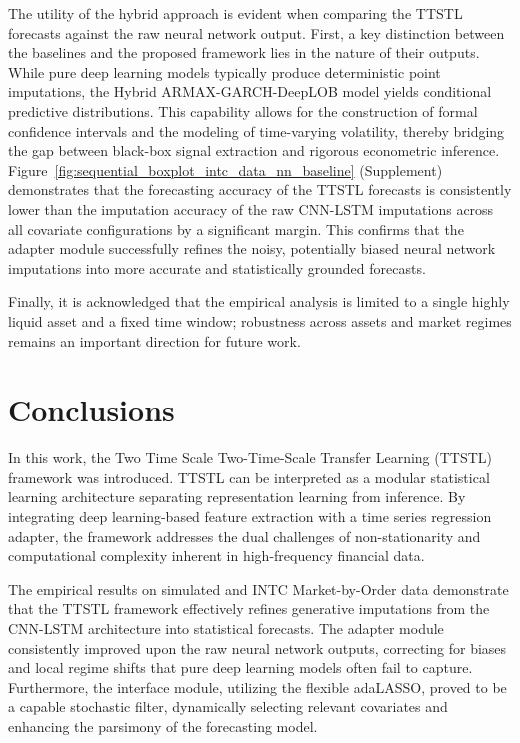 \documentclass[10pt,a4paper,oneside]{article}
\providecommand{\DIFaddtex}[1]{{\protect\color{blue} \sf #1}} %
\providecommand{\DIFdeltex}[1]{{\protect\color{red} \scriptsize #1}} %
\providecommand{\DIFaddbegin}{} %
\providecommand{\DIFaddend}{} %
\providecommand{\DIFdelbegin}{} %
\providecommand{\DIFdelend}{} %
\providecommand{\DIFadd}[1]{\texorpdfstring{\DIFaddtex{#1}}{#1}} %
\providecommand{\DIFdel}[1]{\texorpdfstring{\DIFdeltex{#1}}{}} %
\newcommand{\DIFscaledelfig}{0.5}
\newlength{\DIFdelgraphicswidth} %
\newlength{\DIFdelgraphicsheight} %
\newcommand{\DIFaddincludegraphics}[2][]{{\color{blue}\fbox{\DIFOincludegraphics[#1]{#2}}}} %
\newcommand{\DIFdelincludegraphics}[2][]{%
\sbox{\DIFdelgraphicsbox}{\DIFOincludegraphics[#1]{#2}}%
\settoboxwidth{\DIFdelgraphicswidth}{\DIFdelgraphicsbox} %
\settoboxtotalheight{\DIFdelgraphicsheight}{\DIFdelgraphicsbox} %
\scalebox{\DIFscaledelfig}{%
\parbox[b]{\DIFdelgraphicswidth}{\usebox{\DIFdelgraphicsbox}\\[-\baselineskip] \rule{\DIFdelgraphicswidth}{0em}}\llap{\resizebox{\DIFdelgraphicswidth}{\DIFdelgraphicsheight}{%
\setlength{\unitlength}{\DIFdelgraphicswidth}%
\begin{picture}(1,1)%
\thicklines\linethickness{2pt} %
{\color[rgb]{1,0,0}\put(0,0){\framebox(1,1){}}}%
{\color[rgb]{1,0,0}\put(0,0){\line( 1,1){1}}}%
{\color[rgb]{1,0,0}\put(0,1){\line(1,-1){1}}}%
\end{picture}%
}\hspace*{3pt}}} %
} %
\DeclareRobustCommand{\DIFaddbegin}{\DIFOaddbegin \let\includegraphics\DIFaddincludegraphics} %
\DeclareRobustCommand{\DIFaddend}{\DIFOaddend \let\includegraphics\DIFOincludegraphics} %
\DeclareRobustCommand{\DIFdelbegin}{\DIFOdelbegin \let\includegraphics\DIFdelincludegraphics} %
\DeclareRobustCommand{\DIFdelend}{\DIFOaddend \let\includegraphics\DIFOincludegraphics} %
\begin{document}
The utility of the hybrid approach is evident when comparing the TTSTL forecasts against the raw neural network output. First, a key distinction between the baselines and the proposed framework lies in the nature of their outputs. While pure deep learning models typically produce deterministic point imputations, the Hybrid ARMAX-GARCH-DeepLOB model yields conditional predictive distributions. This capability allows for the construction of formal confidence intervals and the modeling of time-varying volatility, thereby bridging the gap between black-box signal extraction and rigorous econometric inference. Figure~\ref{fig:sequential_boxplot_intc_data_nn_baseline} (Supplement) demonstrates that the forecasting accuracy of the TTSTL forecasts is consistently lower than the imputation accuracy of the raw CNN-LSTM imputations across all covariate configurations by a significant margin. This confirms that the adapter module successfully refines the noisy, potentially biased neural network imputations into more accurate and statistically grounded forecasts.

Finally, it is acknowledged that the empirical analysis is limited to a single highly liquid asset and a fixed time window; robustness across assets and market regimes remains an important direction for future work.

\section{Conclusions}
\label{Sect:Conclusions}

In this work, the \DIFdelbegin \DIFdel{Two Time Scale }\DIFdelend \DIFaddbegin \DIFadd{Two-Time-Scale }\DIFaddend Transfer Learning (TTSTL) framework was introduced. TTSTL can be interpreted as a modular statistical learning architecture separating representation learning from inference. By integrating deep learning-based feature extraction with a time series regression adapter, the framework addresses the dual challenges of non-stationarity and computational complexity inherent in high-frequency financial data.

The empirical results on simulated and INTC Market-by-Order data demonstrate that the TTSTL framework effectively refines generative imputations from the CNN-LSTM architecture into statistical forecasts. The adapter module consistently improved upon the raw neural network outputs, correcting for biases and local regime shifts that pure deep learning models often fail to capture. Furthermore, the interface module, utilizing the flexible adaLASSO, proved to be a capable stochastic filter, dynamically selecting relevant covariates and enhancing the parsimony of the forecasting model.
\end{document}

